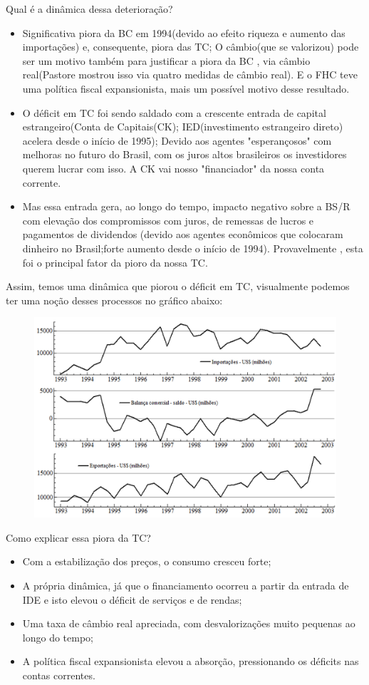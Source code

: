 \documentclass[a4paper,12pt]{article}[abntex2]
\begin{document}
Qual é a dinâmica dessa deterioração?\begin{itemize}
    \item Significativa piora da BC em 1994(devido ao efeito riqueza e aumento das importações) e, consequente, piora das TC; O câmbio(que se valorizou) pode ser um motivo também para justificar a piora da BC , via câmbio real(Pastore mostrou isso via quatro medidas de câmbio real). E o FHC teve uma política fiscal expansionista, mais um possível motivo desse resultado. 
    \item O déficit em TC foi sendo saldado com a crescente entrada de capital estrangeiro(Conta de Capitais(CK); IED(investimento estrangeiro direto) acelera desde o início de 1995); Devido aos agentes "esperançosos" com melhoras no futuro do Brasil, com os juros altos brasileiros os investidores querem lucrar com isso. A CK vai nosso "financiador" da nossa conta corrente.
    \item Mas essa entrada gera, ao longo do tempo, impacto negativo sobre a BS/R com elevação dos compromissos com juros, de remessas de lucros e pagamentos de dividendos (devido aos agentes econômicos que colocaram dinheiro no Brasil;forte aumento desde o início de 1994). Provavelmente , esta foi o principal fator da pioro da nossa TC.
\end{itemize}

Assim, temos uma dinâmica que piorou o déficit em TC, visualmente podemos ter uma noção desses processos no gráfico abaixo:
\begin{figure}[H]
    \centering
    \includegraphics[width=0.7\linewidth]{Imagens/a14i4.png}
\end{figure}

Como explicar essa piora da TC?\begin{itemize}
    \item Com a estabilização dos preços, o consumo cresceu forte;
    \item A própria dinâmica, já que o financiamento ocorreu a partir da entrada de IDE e isto elevou o déficit de serviços e de rendas;
    \item Uma taxa de câmbio real apreciada, com desvalorizações muito pequenas ao longo do tempo;
    \item A política fiscal expansionista elevou a absorção, pressionando os déficits nas contas correntes.
\end{itemize}
\end{document}
